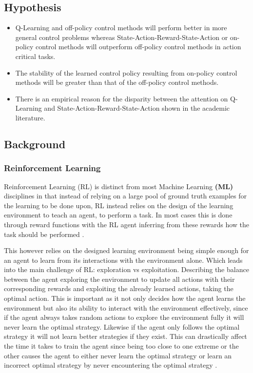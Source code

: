 \documentclass[hidelinks,journal]{IEEEtran}
\begin{document}
\subsection{Hypothesis}
\label{subsec:intHypothesis}
\begin{itemize}
  \item Q-Learning and off-policy control methods will perform better in more general control problems whereas State-Action-Reward-State-Action or on-policy control methods will outperform off-policy control methods in action critical tasks.

  \item The stability of the learned control policy resulting from on-policy control methods will be greater than that of the off-policy control methods.

  \item There is an empirical reason for the disparity between the attention on Q-Learning and State-Action-Reward-State-Action shown in the academic literature.
\end{itemize}
\subsection{Background}
\label{subsec:intBg}
\subsubsection{Reinforcement Learning}
\label{subsubsec:intBgRl}
Reinforcement Learning (RL) is distinct from most Machine Learning  \textbf{(ML)} disciplines in that instead of relying on a large pool of ground truth examples for the learning to be done upon, RL instead relies on the design of the learning environment to teach an agent, to perform a task. In most cases this is done through reward functions with the RL agent inferring from these rewards how the task should be performed \parencite{Kaelbling96}.

This however relies on the designed learning environment being simple enough for an agent to learn from its interactions with the environment alone. Which leads into the main challenge of RL: exploration vs exploitation. Describing the balance between the agent exploring the environment to update all actions with their corresponding rewards and exploiting the already learned actions, taking the optimal action. This is important as it not only decides how the agent learns the environment but also its ability to interact with the environment effectively, since if the agent always takes random actions to explore the environment fully it will never learn the optimal strategy. Likewise if the agent only follows the optimal strategy it will not learn better strategies if they exist. This can drastically affect the time it takes to train the agent since being too close to one extreme or the other causes the agent to either never learn the optimal strategy or learn an incorrect optimal strategy by never encountering the optimal strategy \parencite{Sutton18}.
\end{document}
